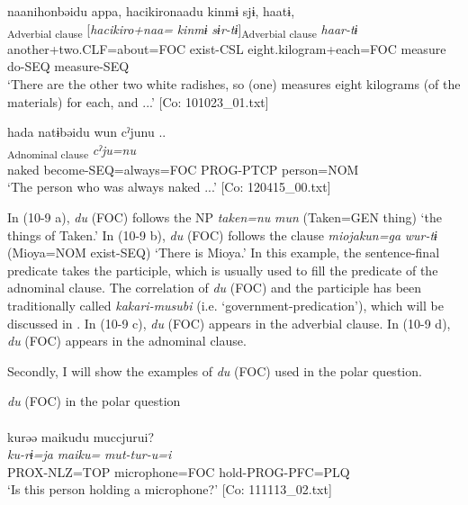   \ex  %
      \glll    naa{\textbar}nihon{\textbar}bəidu  appa,  {\textbar}hacikiro{\textbar}naadu   kinmɨ  sjɨ,  haatɨ,\\
      [\textit{naa+nihon=bəi=\Highlight{du}}  \textit{ar-ba}]\textsubscript{Adverbial clause}  [\textit{hacikiro+naa=} \textit{kinmɨ}  \textit{sɨr-tɨ}]\textsubscript{Adverbial clause}  \textit{haar-tɨ}\\
      another+two.CLF=about=FOC  exist-CSL  eight.kilogram+each=FOC      measure  do-SEQ  measure-SEQ\\
      \glt       ‘There are the other two white radishes, so (one) measures eight kilograms (of the materials) for each, and ...’ [Co: 101023\_01.txt]

  \ex  %
      \glll    hada  natɨbəidu  wun  cˀjunu ..\\
      [\textit{hada}  \textit{nar-tɨ=bəi=\Highlight{du}}  \textit{wur-n}]\textsubscript{Adnominal clause}  \textit{cˀju=nu}\\
      naked  become-SEQ=always=FOC  PROG-PTCP  person=NOM\\
      \glt       ‘The person who was always naked ...’ [Co: 120415\_00.txt]
    \z
\z

In (10-9 a), \textit{du} (FOC) follows the NP \textit{taken=nu} \textit{mun} (Taken=GEN thing) ‘the things of Taken.’ In (10-9 b), \textit{du} (FOC) follows the clause \textit{miojakun=ga} \textit{wur-tɨ} (Mioya=NOM exist-SEQ) ‘There is Mioya.’ In this example, the sentence-final predicate takes the participle, which is usually used to fill the predicate of the adnominal clause. The correlation of \textit{du} (FOC) and the participle has been traditionally called \textit{kakari-musubi} (i.e. ‘government-predication’), which will be discussed in . In (10-9 c), \textit{du} (FOC) appears in the adverbial clause. In (10-9 d), \textit{du} (FOC) appears in the adnominal clause.

  Secondly, I will show the examples of \textit{du} (FOC) used in the polar question.

\ea\label{ex:10.10}   \textit{du} (FOC) in the polar question\\
  \ea\relax  [= (8-76 d)]\\
      \glll    kurəə  {\textbar}maiku{\textbar}du  muccjurui?\\
      \textit{ku-rɨ=ja}  \textit{maiku=}  \textit{mut-tur-u=i}\\
      PROX-NLZ=TOP  microphone=FOC  hold-PROG-PFC=PLQ\\
      \glt       ‘Is this person holding a microphone?’ [Co: 111113\_02.txt]

